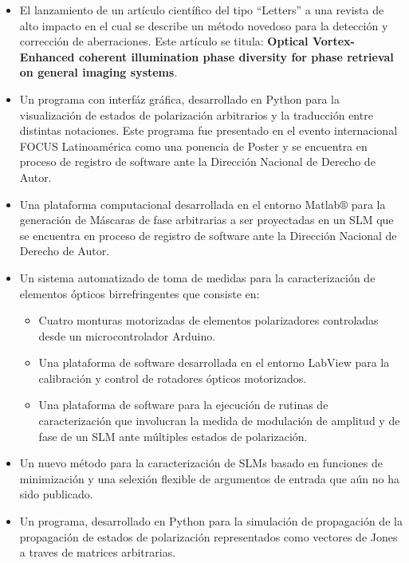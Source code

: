 \begin{itemize}
\item El lanzamiento de un artículo científico del tipo ``Letters'' a una revista de alto
  impacto en el cual se describe un método novedoso para la detección
  y corrección de aberraciones. Este artículo se titula: \textbf{Optical Vortex-Enhanced coherent illumination phase diversity for phase retrieval on general imaging systems}.
  
\item Un programa con interfáz gráfica, desarrollado en Python para la
  visualización de estados de polarización arbitrarios y la traducción entre distintas
  notaciones. Este programa fue presentado en el evento internacional
  FOCUS Latinoamérica como una ponencia de Poster y se encuentra en proceso de registro de
  software ante la Dirección Nacional de Derecho de Autor. 
\item Una plataforma computacional desarrollada en el entorno
  Matlab$\circledR$ para la generación de Máscaras de fase arbitrarias
  a ser proyectadas en un SLM que se encuentra en proceso de registro
  de software ante la Dirección Nacional de Derecho de Autor. 
\item Un sistema automatizado de toma de medidas para la
  caracterización de elementos ópticos birrefringentes que consiste
  en:
  \begin{itemize}
  \item  Cuatro monturas motorizadas de elementos polarizadores
    controladas desde un microcontrolador Arduino.
   \item Una plataforma de software desarrollada en el entorno LabView
     para la calibración y control de rotadores ópticos motorizados.
   \item Una plataforma de software para la ejecución de rutinas de
     caracterización que involucran la medida de modulación de
     amplitud y de fase de un SLM ante múltiples estados de polarización.
  \end{itemize}
\item Un nuevo método para la caracterización de SLMs basado en
  funciones de minimización y una selexión flexible de argumentos de
  entrada que aún no ha sido publicado.
\item Un programa, desarrollado en Python para la
  simulación de propagación de la propagación de estados de
  polarización representados como vectores de Jones a traves de
  matrices arbitrarias.  
\end{itemize}

